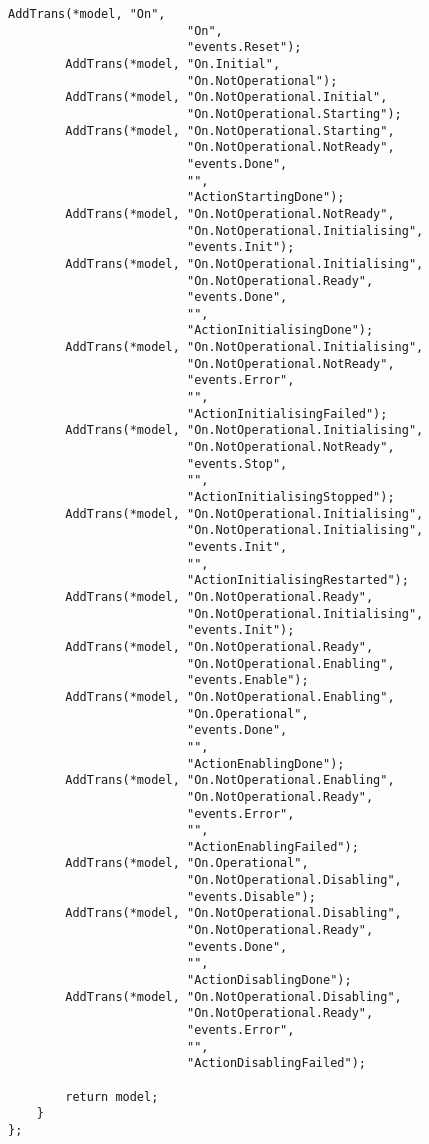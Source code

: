 \begin{lstlisting}[language=CXX, label={lst:annex_basic_model}, caption={Basic life cycle without omissions.}]
        AddTrans(*model, "On",
                         "On",
                         "events.Reset");
        AddTrans(*model, "On.Initial",
                         "On.NotOperational");
        AddTrans(*model, "On.NotOperational.Initial",
                         "On.NotOperational.Starting");
        AddTrans(*model, "On.NotOperational.Starting",
                         "On.NotOperational.NotReady",
                         "events.Done",
                         "",
                         "ActionStartingDone");
        AddTrans(*model, "On.NotOperational.NotReady",
                         "On.NotOperational.Initialising",
                         "events.Init");
        AddTrans(*model, "On.NotOperational.Initialising",
                         "On.NotOperational.Ready",
                         "events.Done",
                         "",
                         "ActionInitialisingDone");
        AddTrans(*model, "On.NotOperational.Initialising",
                         "On.NotOperational.NotReady",
                         "events.Error",
                         "",
                         "ActionInitialisingFailed");
        AddTrans(*model, "On.NotOperational.Initialising",
                         "On.NotOperational.NotReady",
                         "events.Stop",
                         "",
                         "ActionInitialisingStopped");
        AddTrans(*model, "On.NotOperational.Initialising",
                         "On.NotOperational.Initialising",
                         "events.Init",
                         "",
                         "ActionInitialisingRestarted");
        AddTrans(*model, "On.NotOperational.Ready",
                         "On.NotOperational.Initialising",
                         "events.Init");
        AddTrans(*model, "On.NotOperational.Ready",
                         "On.NotOperational.Enabling",
                         "events.Enable");
        AddTrans(*model, "On.NotOperational.Enabling",
                         "On.Operational",
                         "events.Done",
                         "",
                         "ActionEnablingDone");
        AddTrans(*model, "On.NotOperational.Enabling",
                         "On.NotOperational.Ready",
                         "events.Error",
                         "",
                         "ActionEnablingFailed");
        AddTrans(*model, "On.Operational",
                         "On.NotOperational.Disabling",
                         "events.Disable");
        AddTrans(*model, "On.NotOperational.Disabling",
                         "On.NotOperational.Ready",
                         "events.Done",
                         "",
                         "ActionDisablingDone");
        AddTrans(*model, "On.NotOperational.Disabling",
                         "On.NotOperational.Ready",
                         "events.Error",
                         "",
                         "ActionDisablingFailed");

        return model;
    }
};
\end{lstlisting}



